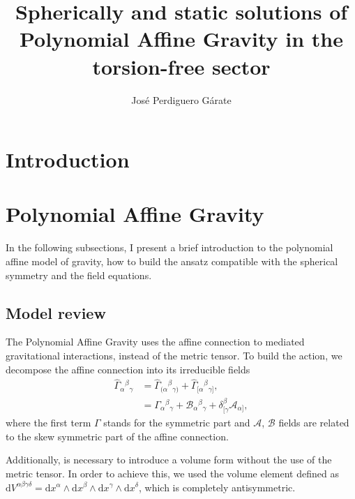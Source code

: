 \documentclass{article}
\title{Spherically and static solutions of Polynomial Affine Gravity in the torsion-free sector}
\author{Jos\'e Perdiguero G\'arate}
\providecommand{\ctG}[3]{\Gamma_{#1}{}^{ #2}{}_{#3}}
\providecommand{\B}[3]{\mathcal{B}_{#1}{}^{ #2}{}_{#3}}
\providecommand{\A}[1]{\mathcal{A}_{#1}}
\begin{document}
\maketitle
\tableofcontents

\section{Introduction}
\label{sec:Introduction}



\section{Polynomial Affine Gravity}
\label{sec:PAG}

In the following subsections, I present a brief introduction
to the polynomial affine model of gravity, how to build the
ansatz compatible with the spherical symmetry and the field 
equations.

\subsection{Model review}
\label{subsec: model_review}

The Polynomial Affine Gravity uses the affine connection to mediated 
gravitational interactions, instead of the metric tensor. To build 
the action, we decompose the affine connection into its irreducible
fields
\begin{equation}
\begin{aligned}
    \label{affine_connection}
    \hat{\Gamma}_{\alpha}{}^{\beta}{}_{\gamma} & = \hat{\Gamma}_{(\alpha}{}^{\beta}{}_{\gamma)} +  \hat{\Gamma}_{[\alpha}{}^{\beta}{}_{\gamma]},  \\
    & = \ctG{\alpha}{\beta}{\gamma} + \B{\alpha}{\beta}{\gamma} + \delta^{\beta}_{[\gamma}\A{\alpha]},
\end{aligned}
\end{equation}
where the first term $\Gamma$ stands for the symmetric part and 
$\mathcal{A}$, $\mathcal{B}$ fields are related to the skew symmetric
part of the affine connection. 

Additionally, is necessary to introduce a volume form without
the use of the metric tensor. In order to achieve this, we used
the volume element defined as $\mathrm{d}V^{\alpha \beta \gamma \delta} 
= \mathrm{d}x^\alpha \wedge \mathrm{d}x^\beta \wedge \mathrm{d}x^\gamma
\wedge \mathrm{d}x^\delta$, which is completely antisymmetric.
\end{document}
